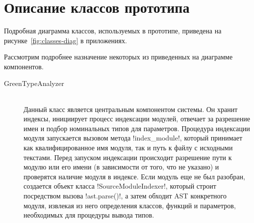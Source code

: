 \section{Описание классов прототипа}
\label{sec:classes-description}

Подробная диаграмма классов, используемых в прототипе, приведена на
 рисунке~\ref{fig:classes-diag} в приложениях.

Рассмотрим подробнее назначение некоторых из приведенных на диаграмме компонентов.

\begin{description}
  \item[GreenTypeAnalyzer] \hfill \\
    Данный класс является центральным компонентом системы. Он хранит индексы,
    инициирует процесс индексации модулей, отвечает за разрешение имен и подбор
    номинальных типов для параметров. Процедура индексации модуля запускается
    вызовом метода !index_module!, который принимает как квалифицированное имя
    модуля, так и путь к файлу с исходными текстами. Перед запуском индексации
    происходит разрешение пути к модулю или его имени (в зависимости от того,
    что не указано) и проверятся наличие модуля в индексе. Если модуль еще не
    был разобран, создается объект класса !SourceModuleIndexer!, который
    строит посредством вызова !ast.parse()!, а затем обходит AST конкретного
    модуля, извлекая из него определения классов, функций и параметров,
    необходимых для процедуры вывода типов.


\end{description}
